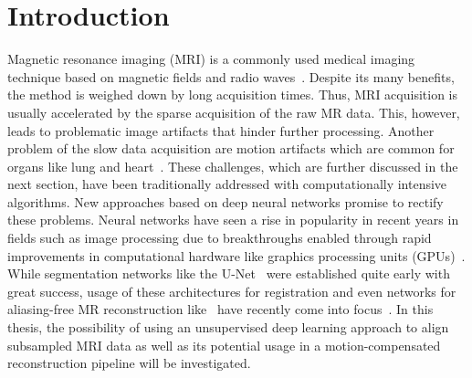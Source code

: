 
\chapter{Introduction} \label{Ch:Introduction}
Magnetic resonance imaging (MRI) is a commonly used medical imaging technique based on magnetic fields and radio waves~\cite{Brown2014,Serai2021,Singh2023}. Despite its many benefits, the method is weighed down by long acquisition times.
Thus, MRI acquisition is usually accelerated by the sparse acquisition of the raw MR data. This, however, leads to problematic image artifacts that hinder further processing. Another problem of the slow data acquisition are motion artifacts which are common for organs like lung and heart~\cite{Chen2022}. These challenges, which are further discussed in the next section, have been traditionally addressed with computationally intensive algorithms. New approaches based on deep neural networks promise to rectify these problems. Neural networks have seen a rise in popularity in recent years in fields such as image processing due to breakthroughs enabled through rapid improvements in computational hardware like graphics processing units (GPUs)~\cite{Chen2020}. While segmentation networks like the U-Net~\cite{U-Net} were established quite early with great success, usage of these architectures for registration and even networks for aliasing-free MR reconstruction like~\cite{Kuestner2022,Ghoul2024,Pan2024} have recently come into focus~\cite{Chen2020,Haskins2020}. In this thesis, the possibility of using an unsupervised deep learning approach to align subsampled MRI data as well as its potential usage in a motion-compensated reconstruction pipeline will be investigated.


